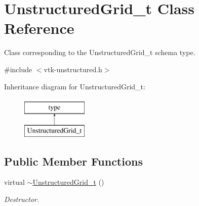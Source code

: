 \hypertarget{classUnstructuredGrid__t}{}\section{Unstructured\+Grid\+\_\+t Class Reference}
\label{classUnstructuredGrid__t}


Class corresponding to the Unstructured\+Grid\+\_\+t schema type.  




{\ttfamily \#include $<$vtk-\/unstructured.\+h$>$}

Inheritance diagram for Unstructured\+Grid\+\_\+t\+:\begin{figure}[H]
\begin{center}
\leavevmode
\includegraphics[height=2.000000cm]{classUnstructuredGrid__t}
\end{center}
\end{figure}
\subsection*{Public Member Functions}
\begin{DoxyCompactItemize}
\item 
virtual \hyperlink{classUnstructuredGrid__t_a6fb9239ab1215edd7e7822a66d3af53c}{$\sim$\+Unstructured\+Grid\+\_\+t} ()
\begin{DoxyCompactList}\small\item\em Destructor. \end{DoxyCompactList}\end{DoxyCompactItemize}
